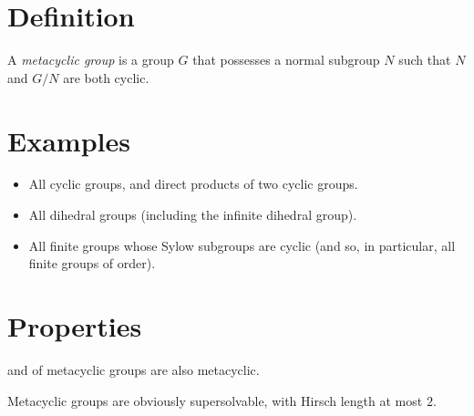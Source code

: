 \documentclass[12pt]{article}
\begin{document}

\section*{Definition}

A \emph{metacyclic group} is a group $G$ that possesses a normal subgroup $N$ such that $N$ and $G/N$ are both cyclic.

\section*{Examples}

\begin{itemize}
\item All cyclic groups, and direct products of two cyclic groups.
\item All dihedral groups (including the infinite dihedral group).
\item All finite groups whose Sylow subgroups are cyclic (and so, in particular, all finite groups of  order).
\end{itemize}

\section*{Properties}

 and  of metacyclic groups are also metacyclic.

Metacyclic groups are obviously supersolvable, with Hirsch length at most $2$.
\end{document}
